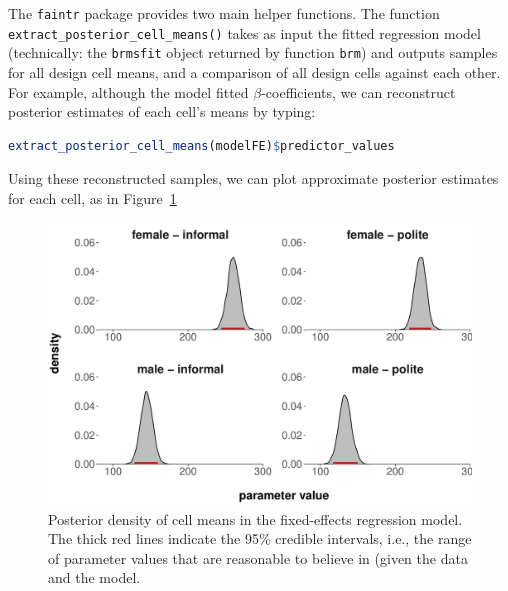 \documentclass[nobib]{tufte-handout}
\begin{document}
The \texttt{faintr} package provides two main helper functions.
%
%
The function \texttt{extract\_posterior\_cell\_means()}
takes as input the fitted regression model (technically: the \texttt{brmsfit} object returned by function \texttt{brm}) and outputs samples for all design cell means, and a comparison of all design cells against each other.
For example, although the model fitted $\beta$-coefficients, we can reconstruct posterior estimates of each cell's means by typing:

\begin{minipage}[]{1.3\textwidth}
\begin{lstlisting}[language=R]
extract_posterior_cell_means(modelFE)$predictor_values
\end{lstlisting}
\end{minipage}

\vspace*{-0.5cm}

\noindent Using these reconstructed samples, we can plot approximate posterior estimates for each cell, as in Figure~\ref{fig:Posteriors_cell_means}

\begin{figure}
  \centering
  \includegraphics[width=\textwidth]{pics/posterior_density_cell_means.pdf}
  \caption[Posteriors over cell means in fixed-effects model]{Posterior density of cell means
    in the fixed-effects regression model. The thick red lines indicate the 95\% credible
    intervals, i.e., the range of parameter values that are reasonable to believe in (given the data and the model.}
  \label{fig:Posteriors_cell_means}
\end{figure}
\end{document}
